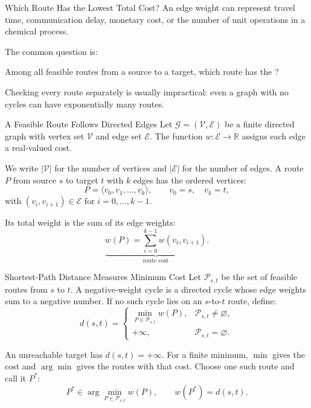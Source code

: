 \documentclass[aspectratio=169,11pt]{beamer}
\begin{document}
\begin{frame}{Which Route Has the Lowest Total Cost?}
  An edge weight can represent travel time, communication delay, monetary cost,
  or the number of unit operations in a chemical process.

  \vspace{0.9em}
  The common question is:

  \vspace{0.5em}
  \begin{center}
    \begin{minipage}{0.82\textwidth}
      \centering\Large
      Among all feasible routes from a source to a target, which route has the
      ?
    \end{minipage}
  \end{center}

  \vspace{0.9em}
  Checking every route separately is usually impractical: even a graph with
  no cycles can have exponentially many routes.
\end{frame}

\begin{frame}{A Feasible Route Follows Directed Edges}
  Let $\mathcal G=(\mathcal V,\mathcal E)$ be a finite directed graph with vertex
  set $\mathcal V$ and edge set $\mathcal E$. The function
  $w:\mathcal E\rightarrow\mathbb R$ assigns each edge a real-valued cost.

  We write $|\mathcal V|$ for the number of vertices and $|\mathcal E|$ for the
  number of edges. A route $P$ from source $s$ to target $t$ with $k$ edges has
  the ordered vertices:
  \[
    P=\langle v_0,v_1,\ldots,v_k\rangle,
    \qquad v_0=s,\quad v_k=t,
  \]
  with $(v_i,v_{i+1})\in\mathcal E$ for $i=0,\ldots,k-1$.

  Its total weight is the sum of its edge weights:
  \[
    \underbrace{w(P)=\sum_{i=0}^{k-1}w(v_i,v_{i+1})}_{\text{route cost}}.
  \]
\end{frame}

\begin{frame}{Shortest-Path Distance Measures Minimum Cost}
  Let $\mathcal P_{s,t}$ be the set of feasible routes from $s$ to $t$.
  A negative-weight cycle is a directed cycle whose edge weights sum to a
  negative number. If no such cycle lies on an $s$-to-$t$ route, define:
  \[
    d(s,t)=
    \begin{cases}
      \displaystyle\min_{P\in\mathcal P_{s,t}}w(P),
        & \mathcal P_{s,t}\neq\varnothing,\\[5pt]
      +\infty, & \mathcal P_{s,t}=\varnothing.
    \end{cases}
  \]

  An unreachable target has $d(s,t)=+\infty$. For a finite minimum,
  $\min$ gives the cost and $\arg\min$ gives the routes with that cost.
  Choose one such route and call it $P^*$:
  \[
    P^*\in\arg\min_{P\in\mathcal P_{s,t}}w(P),
    \qquad w(P^*)=d(s,t).
  \]
\end{frame}
\end{document}

